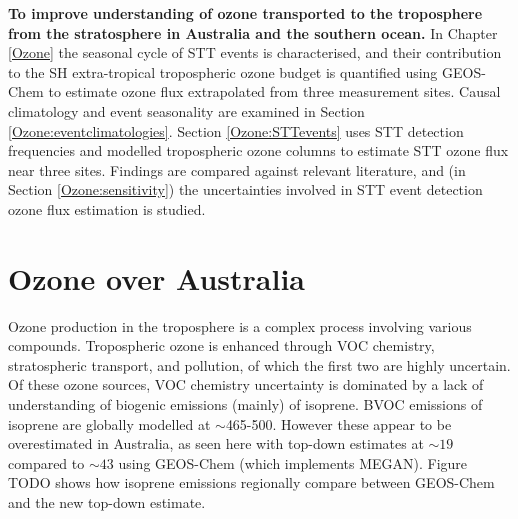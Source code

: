   \textbf{To improve understanding of ozone transported to the troposphere from the stratosphere in Australia and the southern ocean.}
  In Chapter \ref{Ozone} the seasonal cycle of STT events is characterised, and their contribution to the SH extra-tropical tropospheric ozone budget is quantified using GEOS-Chem to estimate ozone flux extrapolated from three measurement sites.
  Causal climatology and event seasonality are examined in Section \ref{Ozone:eventclimatologies}.
  Section \ref{Ozone:STTevents} uses STT detection frequencies and modelled tropospheric ozone columns to estimate STT ozone flux near three sites. 
  Findings are compared against relevant literature, and (in Section \ref{Ozone:sensitivity}) the uncertainties involved in STT event detection ozone flux estimation is studied.
  

\section{Ozone over Australia}
\label{Conclusions:ozone}
  
  Ozone production in the troposphere is a complex process involving various compounds.
  Tropospheric ozone is enhanced through VOC chemistry, stratospheric transport, and pollution, of which the first two are highly uncertain.
  Of these ozone sources, VOC chemistry uncertainty is dominated by a lack of understanding of biogenic emissions (mainly) of isoprene.
  BVOC emissions of isoprene are globally modelled at $\sim$465-500\tgcpyr \parencite{Guenther2006, Messina2016}. 
  However these appear to be overestimated in Australia, as seen here with top-down estimates at $\sim 19$ \tgcpyr compared to $\sim 43$ \tgcpyr using GEOS-Chem (which implements MEGAN).
  Figure TODO shows how isoprene emissions regionally compare between GEOS-Chem and the new top-down estimate.
  
